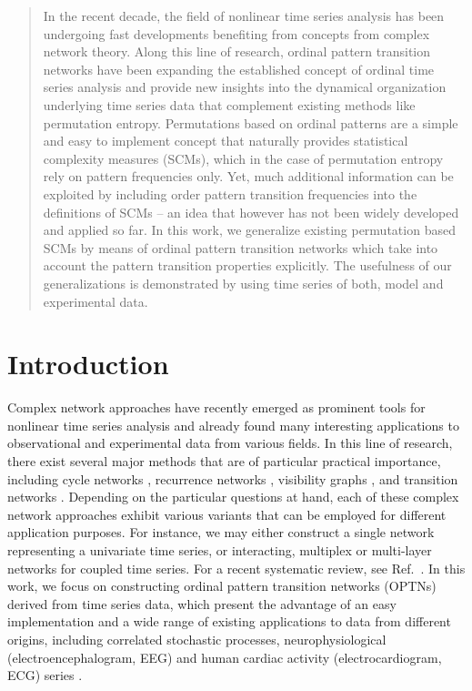 \documentclass[12pt,aip,cha,reprint,nofootinbib]{revtex4-1}
\begin{document}
\maketitle

\begin{quotation}
In the recent decade, the field of nonlinear time series analysis has been undergoing fast developments benefiting from concepts from complex network theory. Along this line of research, ordinal pattern transition networks have been expanding the established concept of ordinal time series analysis and provide new insights into the dynamical organization underlying time series data that complement existing methods like permutation entropy. Permutations based on ordinal patterns are a simple and easy to implement concept that naturally provides statistical complexity measures (SCMs), which in the case of permutation entropy rely on pattern frequencies only. Yet, much additional information can be exploited by including order pattern transition frequencies into the definitions of SCMs -- an idea that however has not been widely developed and applied so far. In this work, we generalize existing permutation based SCMs by means of ordinal pattern transition networks which take into account the pattern transition properties explicitly. The usefulness of our generalizations is demonstrated by using time series of both, model and experimental data. 
\end{quotation}

\section{Introduction}
Complex network approaches \cite{ZouPR2018} have recently emerged as prominent tools for nonlinear time series analysis \cite{Kantz97,Sprott2003} and already found many interesting applications to observational and experimental data from various fields. In this line of research, there exist several major methods that are of particular practical importance, including cycle networks \cite{ZhangPRL2006}, recurrence networks \cite{MarwanPLA2009,Donner2010a}, visibility graphs \cite{Lacasa2008,Nunez2012}, and transition networks \cite{Nicolis2005,MichaelChaos2015}. Depending on the particular questions at hand, each of these complex network approaches exhibit various variants that can be employed for different application purposes. For instance, we may either construct a single network representing a univariate time series, or interacting, multiplex or multi-layer networks for coupled time series. For a recent systematic review, see Ref.~\cite{ZouPR2018}. In this work, we focus on constructing ordinal pattern transition networks (OPTNs) derived from time series data, which present the advantage of an easy implementation and a wide range of existing applications to data from different origins, including correlated stochastic processes, neurophysiological (electroencephalogram, EEG) and human cardiac activity (electrocardiogram, ECG) series \cite{MichaelChaos2015,KulpChaos2016,zhangSciRep2017,McCullough2017b,BorgesAMC2019,Subramaniyam2020}. 
\end{document}
